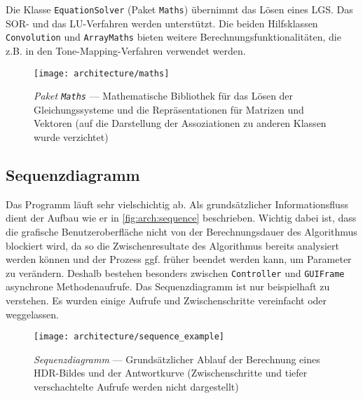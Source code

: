 Die Klasse \texttt{EquationSolver} (Paket \texttt{Maths}) übernimmt das Lösen eines \gls{LGS}. Das \gls{SOR}- und das LU-Verfahren werden unterstützt. Die beiden Hilfsklassen \texttt{Convolution} und \texttt{ArrayMaths} bieten weitere Berechnungsfunktionalitäten, die z.B. in den \gls{Tone-Mapping}-Verfahren verwendet werden. 

\begin{figure}
  \begin{center}
    \texttt{[image: architecture/maths]}
    \caption{\textit{Paket \texttt{Maths}} --- Mathematische Bibliothek für das Lösen der Gleichungssysteme und die Repräsentationen für Matrizen und Vektoren (auf die Darstellung der Assoziationen zu anderen Klassen wurde verzichtet)}
    \label{fig:arch:matrix}
  \end{center}
\end{figure}




\subsection{Sequenzdiagramm}
Das Programm läuft sehr vielschichtig ab. Als grundsätzlicher Informationsfluss dient der Aufbau wie er in \autoref{fig:arch:sequence} beschrieben. Wichtig dabei ist, dass die grafische Benutzeroberfläche nicht von der Berechnungsdauer des Algorithmus blockiert wird, da so die Zwischenresultate des Algorithmus bereits analysiert werden können und der Prozess ggf. früher beendet werden kann, um Parameter zu verändern. Deshalb bestehen besonders zwischen \texttt{Controller} und \texttt{GUIFrame} asynchrone Methodenaufrufe. Das Sequenzdiagramm ist nur beispielhaft zu verstehen. Es wurden einige Aufrufe und Zwischenschritte vereinfacht oder weggelassen.

\begin{figure}
  \begin{center}
    \texttt{[image: architecture/sequence\_example]}
    \caption{\textit{Sequenzdiagramm} --- Grundsätzlicher Ablauf der Berechnung eines HDR-Bildes und der Antwortkurve (Zwischenschritte und tiefer verschachtelte Aufrufe werden nicht dargestellt) }
    \label{fig:arch:sequence}
  \end{center}
\end{figure}


